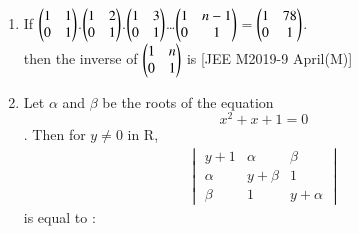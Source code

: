 \documentclass[journal,,12pt,twocolumn]{IEEEtran}
\theoremstyle{remark}
\begin{document}
\begin{enumerate}
\begin{enumerate}
\end{enumerate} 
\item If $\begin{pmatrix}
    1 & 1 \\
    0 & 1
\end{pmatrix}$.$\begin{pmatrix}
    1 & 2 \\
    0 & 1
\end{pmatrix}$.$\begin{pmatrix}
    1 & 3 \\
    0 & 1
\end{pmatrix}$\dots $\begin{pmatrix}
    1 & n-1 \\
    0 & 1
\end{pmatrix}$$=$$\begin{pmatrix}
    1 & 78 \\
    0 & 1
\end{pmatrix}$.\\
then the inverse of $\begin{pmatrix}
    1 & n \\
    0 & 1
\end{pmatrix}$ is 
\hfill{[JEE M2019-9 April(M)]} 
\begin{enumerate}
\end{enumerate}
\item Let $\alpha$ and $\beta$ be the roots of the equation $$x^2+x+1=0$$. Then for $y\ne0$ in R,\\
\begin{align*}\begin{vmatrix}
   y+1 & \alpha & \beta \\
    \alpha & y+\beta & 1 \\
    \beta & 1 & y+\alpha
\end{vmatrix} \end{align*} is equal to : 

\end{enumerate}
\end{document}
